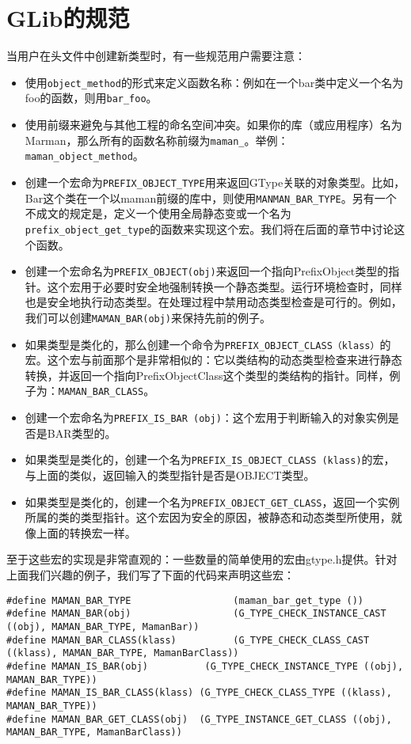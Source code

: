 \section{GLib的规范}
当用户在头文件中创建新类型时，有一些规范用户需要注意：
\begin{itemize}
	\item 使用\verb|object_method|的形式来定义函数名称：例如在一个bar类中定义一个名为foo的函数，则用\verb|bar_foo|。
	\item 使用前缀来避免与其他工程的命名空间冲突。如果你的库（或应用程序）名为Marman，那么所有的函数名称前缀为\verb|maman_|。举例：\verb|maman_object_method|。
	\item 创建一个宏命为\verb|PREFIX_OBJECT_TYPE|用来返回GType关联的对象类型。比如，Bar这个类在一个以maman前缀的库中，则使用\verb|MANMAN_BAR_TYPE|。另有一个不成文的规定是，定义一个使用全局静态变或一个名为\verb|prefix_object_get_type|的函数来实现这个宏。我们将在后面的章节中讨论这个函数。
	\item 创建一个宏命名为\verb|PREFIX_OBJECT(obj)|来返回一个指向PrefixObject类型的指针。这个宏用于必要时安全地强制转换一个静态类型。运行环境检查时，同样也是安全地执行动态类型。在处理过程中禁用动态类型检查是可行的。例如，我们可以创建\verb|MAMAN_BAR(obj)|来保持先前的例子。
	\item 如果类型是类化的，那么创建一个命令为\verb|PREFIX_OBJECT_CLASS（klass）|的宏。这个宏与前面那个是非常相似的：它以类结构的动态类型检查来进行静态转换，并返回一个指向PrefixObjectClass这个类型的类结构的指针。同样，例子为：\verb|MAMAN_BAR_CLASS|。
	\item 创建一个宏命名为\verb|PREFIX_IS_BAR (obj)|：这个宏用于判断输入的对象实例是否是BAR类型的。
	\item 如果类型是类化的，创建一个名为\verb|PREFIX_IS_OBJECT_CLASS (klass)|的宏，与上面的类似，返回输入的类型指针是否是OBJECT类型。
	\item 如果类型是类化的，创建一个名为\verb|PREFIX_OBJECT_GET_CLASS|，返回一个实例所属的类的类型指针。这个宏因为安全的原因，被静态和动态类型所使用，就像上面的转换宏一样。
\end{itemize}
至于这些宏的实现是非常直观的：一些数量的简单使用的宏由gtype.h提供。针对上面我们兴趣的例子，我们写了下面的代码来声明这些宏：
\begin{verbatim}
#define MAMAN_BAR_TYPE                  (maman_bar_get_type ())
#define MAMAN_BAR(obj)                  (G_TYPE_CHECK_INSTANCE_CAST ((obj), MAMAN_BAR_TYPE, MamanBar))
#define MAMAN_BAR_CLASS(klass)          (G_TYPE_CHECK_CLASS_CAST ((klass), MAMAN_BAR_TYPE, MamanBarClass))
#define MAMAN_IS_BAR(obj)          (G_TYPE_CHECK_INSTANCE_TYPE ((obj), MAMAN_BAR_TYPE))
#define MAMAN_IS_BAR_CLASS(klass) (G_TYPE_CHECK_CLASS_TYPE ((klass), MAMAN_BAR_TYPE))
#define MAMAN_BAR_GET_CLASS(obj)  (G_TYPE_INSTANCE_GET_CLASS ((obj), MAMAN_BAR_TYPE, MamanBarClass))
\end{verbatim}
